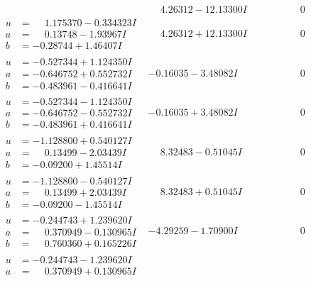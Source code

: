 \documentclass[1p]{elsarticle_modified}
\theoremstyle{definition}
\begin{document}
$$\begin{array}{c|c|c}
 & \phantom{-}4.26312 - 12.13300 I & \phantom{-0.000000 } 0 \\ \hline\begin{aligned}
u &= \phantom{-}1.175370 - 0.334323 I \\
a &= \phantom{-}0.13748 - 1.93967 I \\
b &= -0.28744 + 1.46407 I\end{aligned}
 & \phantom{-}4.26312 + 12.13300 I & \phantom{-0.000000 } 0 \\ \hline\begin{aligned}
u &= -0.527344 + 1.124350 I \\
a &= -0.646752 + 0.552732 I \\
b &= -0.483961 - 0.416641 I\end{aligned}
 & -0.16035 - 3.48082 I & \phantom{-0.000000 } 0 \\ \hline\begin{aligned}
u &= -0.527344 - 1.124350 I \\
a &= -0.646752 - 0.552732 I \\
b &= -0.483961 + 0.416641 I\end{aligned}
 & -0.16035 + 3.48082 I & \phantom{-0.000000 } 0 \\ \hline\begin{aligned}
u &= -1.128800 + 0.540127 I \\
a &= \phantom{-}0.13499 - 2.03439 I \\
b &= -0.09200 + 1.45514 I\end{aligned}
 & \phantom{-}8.32483 - 0.51045 I & \phantom{-0.000000 } 0 \\ \hline\begin{aligned}
u &= -1.128800 - 0.540127 I \\
a &= \phantom{-}0.13499 + 2.03439 I \\
b &= -0.09200 - 1.45514 I\end{aligned}
 & \phantom{-}8.32483 + 0.51045 I & \phantom{-0.000000 } 0 \\ \hline\begin{aligned}
u &= -0.244743 + 1.239620 I \\
a &= \phantom{-}0.370949 - 0.130965 I \\
b &= \phantom{-}0.760360 + 0.165226 I\end{aligned}
 & -4.29259 - 1.70900 I & \phantom{-0.000000 } 0 \\ \hline\begin{aligned}
u &= -0.244743 - 1.239620 I \\
a &= \phantom{-}0.370949 + 0.130965 I \\

\end{aligned}
\end{array}$$
\end{document}
